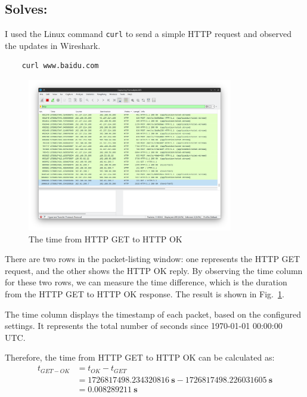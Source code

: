 \documentclass{cshwk}
\begin{document}
\subsection*{Solves:}

I used the Linux command \texttt{curl} to send a simple HTTP request and observed the updates in Wireshark.
\begin{verbatim}
    curl www.baidu.com
\end{verbatim}
\begin{figure}[htbp]
    \centering
    \includegraphics[width=0.8\textwidth]{./lab1-2.png}
    \caption{The time from HTTP GET to HTTP OK}
    \label{fig:timing}
\end{figure}

There are two rows in the packet-listing window: one represents the HTTP GET request, and the other shows the HTTP OK reply. By observing the time column for these two rows, we can measure the time difference, which is the duration from the HTTP GET to HTTP OK response. The result is shown in Fig.~\ref{fig:timing}.

The time column displays the timestamp of each packet, based on the configured settings. It represents the total number of seconds since 1970-01-01 00:00:00 UTC.

Therefore, the time from HTTP GET to HTTP OK can be calculated as:
\begin{align*}
    t_{GET-OK} & = t_{OK} - t_{GET}                                                  \\
               & = 1726817498.234320816~\mathbf{s} - 1726817498.226031605~\mathbf{s} \\
               & \boxed{= 0.008289211 ~\mathbf{s}}
\end{align*}
\end{document}
